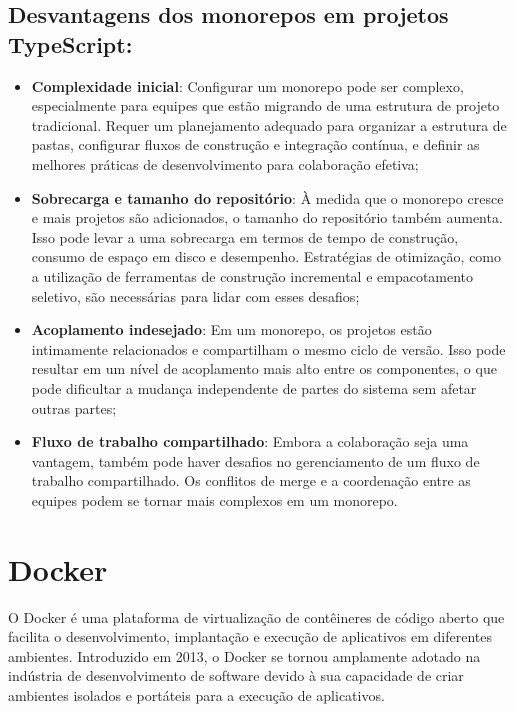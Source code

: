\subsection*{Desvantagens dos monorepos em projetos TypeScript:}
\begin{itemize}
    \item \textbf{Complexidade inicial}: Configurar um monorepo pode ser complexo, especialmente para equipes que estão migrando de uma estrutura de projeto tradicional. Requer um planejamento adequado para organizar a estrutura de pastas, configurar fluxos de construção e integração contínua, e definir as melhores práticas de desenvolvimento para colaboração efetiva;

    \item \textbf{Sobrecarga e tamanho do repositório}: À medida que o monorepo cresce e mais projetos são adicionados, o tamanho do repositório também aumenta. Isso pode levar a uma sobrecarga em termos de tempo de construção, consumo de espaço em disco e desempenho. Estratégias de otimização, como a utilização de ferramentas de construção incremental e empacotamento seletivo, são necessárias para lidar com esses desafios;

    \item \textbf{Acoplamento indesejado}: Em um monorepo, os projetos estão intimamente relacionados e compartilham o mesmo ciclo de versão. Isso pode resultar em um nível de acoplamento mais alto entre os componentes, o que pode dificultar a mudança independente de partes do sistema sem afetar outras partes;

    \item \textbf{Fluxo de trabalho compartilhado}: Embora a colaboração seja uma vantagem, também pode haver desafios no gerenciamento de um fluxo de trabalho compartilhado. Os conflitos de merge e a coordenação entre as equipes podem se tornar mais complexos em um monorepo.
\end{itemize}

\section{Docker}

O Docker é uma plataforma de virtualização de contêineres de código aberto que facilita
o desenvolvimento, implantação e execução de aplicativos em diferentes ambientes. Introduzido
em 2013, o Docker se tornou amplamente adotado na indústria de desenvolvimento de software
devido à sua capacidade de criar ambientes isolados e portáteis para a execução de aplicativos.

